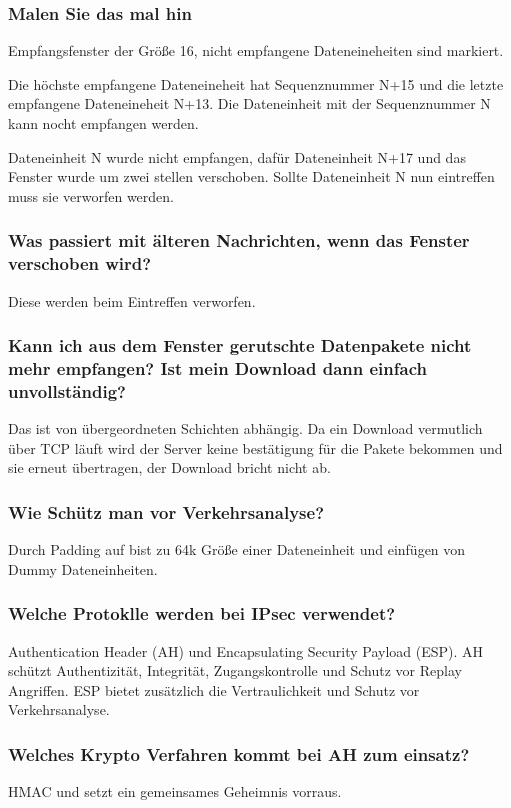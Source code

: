 	\subsubsection{Malen Sie das mal hin}
	Empfangsfenster der Größe 16, nicht empfangene Dateneineheiten sind markiert.

	Die höchste empfangene Dateneineheit hat Sequenznummer N+15 und die letzte empfangene Dateneineheit N+13. Die Dateneinheit mit der Sequenznummer N kann nocht empfangen werden.

	Dateneinheit N wurde nicht empfangen, dafür Dateneinheit N+17 und das Fenster wurde um zwei stellen verschoben. Sollte Dateneinheit N nun eintreffen muss sie verworfen werden.
	
	\subsubsection{Was passiert mit älteren Nachrichten, wenn das Fenster verschoben wird?}
	Diese werden beim Eintreffen verworfen.
	
	\subsubsection{Kann ich aus dem Fenster gerutschte Datenpakete nicht mehr empfangen? Ist mein Download dann einfach unvollständig?}
	Das ist von übergeordneten Schichten abhängig. Da ein Download vermutlich über TCP läuft wird der Server keine bestätigung für die Pakete bekommen und sie erneut übertragen, der Download bricht nicht ab.
	
	\subsubsection{Wie Schütz man vor Verkehrsanalyse?}
	Durch Padding auf bist zu 64k Größe einer Dateneinheit und einfügen von Dummy Dateneinheiten.
	
\subsubsection{Welche Protoklle werden bei IPsec verwendet?}
	Authentication Header (AH) und Encapsulating Security Payload (ESP). AH schützt Authentizität, Integrität, Zugangskontrolle und Schutz vor Replay Angriffen. ESP bietet zusätzlich die Vertraulichkeit und Schutz vor Verkehrsanalyse.
	
	\subsubsection{Welches Krypto Verfahren kommt bei AH zum einsatz?}
	HMAC und setzt ein gemeinsames Geheimnis vorraus.
	
